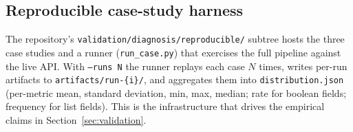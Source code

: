 \subsection{Reproducible case-study harness}

The repository's \texttt{validation/diagnosis/reproducible/} subtree hosts the
three case studies and a runner (\texttt{run\_case.py}) that exercises
the full pipeline against the live API. With \texttt{--runs N} the
runner replays each case $N$ times, writes per-run artifacts to
\texttt{artifacts/run-\{i\}/}, and aggregates them into
\texttt{distribution.json} (per-metric mean, standard deviation, min,
max, median; rate for boolean fields; frequency for list fields).
This is the infrastructure that drives the empirical claims in
Section~\ref{sec:validation}.

